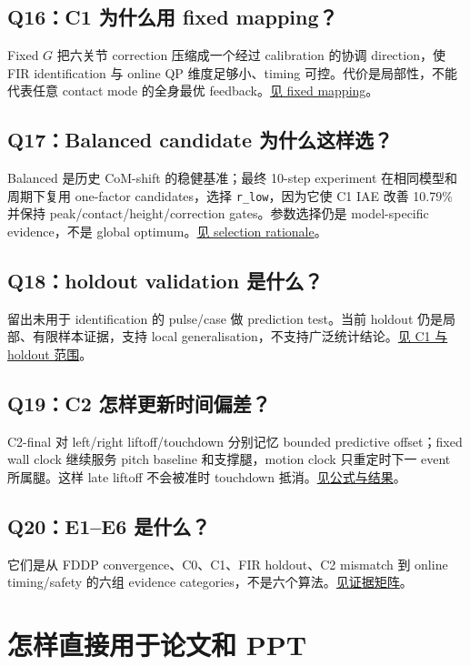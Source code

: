 \documentclass[UTF8,11pt,a4paper]{ctexart}
\newcommand{\code}[1]{\texttt{#1}}
\begin{document}
\subsection{Q16：C1 为什么用 fixed mapping？}\label{q16}
Fixed $G$ 把六关节 correction 压缩成一个经过 calibration 的协调 direction，使 FIR identification 与 online QP 维度足够小、timing 可控。代价是局部性，不能代表任意 contact mode 的全身最优 feedback。\hyperref[sec:mapping]{见 fixed mapping}。

\subsection{Q17：Balanced candidate 为什么这样选？}\label{q17}
Balanced 是历史 CoM-shift 的稳健基准；最终 10-step experiment 在相同模型和周期下复用 one-factor candidates，选择 \code{r\_low}，因为它使 C1 IAE 改善 10.79\% 并保持 peak/contact/height/correction gates。参数选择仍是 model-specific evidence，不是 global optimum。\hyperref[sec:balanced]{见 selection rationale}。

\subsection{Q18：holdout validation 是什么？}\label{q18}
留出未用于 identification 的 pulse/case 做 prediction test。当前 holdout 仍是局部、有限样本证据，支持 local generalisation，不支持广泛统计结论。\hyperref[sec:balanced]{见 C1 与 holdout 范围}。

\subsection{Q19：C2 怎样更新时间偏差？}\label{q19}
C2-final 对 left/right liftoff/touchdown 分别记忆 bounded predictive offset；fixed wall clock 继续服务 pitch baseline 和支撑腿，motion clock 只重定时下一 event 所属腿。这样 late liftoff 不会被准时 touchdown 抵消。\hyperref[sec:c2]{见公式与结果}。

\subsection{Q20：E1--E6 是什么？}\label{q20}
它们是从 FDDP convergence、C0、C1、FIR holdout、C2 mismatch 到 online timing/safety 的六组 evidence categories，不是六个算法。\hyperref[sec:evidence]{见证据矩阵}。

\section{怎样直接用于论文和 PPT}\label{sec:writing_ppt}
\end{document}
